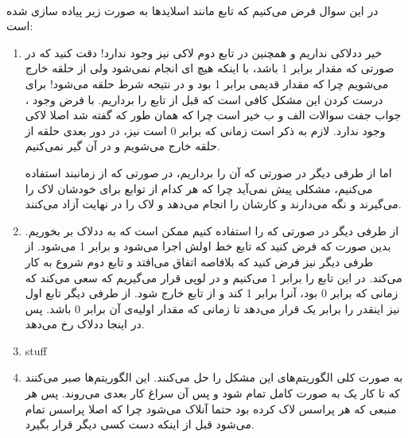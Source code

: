 \\\noindent
در این سوال فرض می‌کنیم که تابع
مانند اسلاید‌ها به صورت زیر پیاده سازی شده است:
\begin{enumerate}
    \item خیر ددلاکی نداریم و همچنین در تابع دوم لاکی نیز وجود ندارد!
    دقت کنید که در صورتی که مقدار
    برابر 1 باشد، با اینکه هیچ
    ای
    انجام نمی‌شود ولی از حلقه خارج می‌شویم چرا که مقدار قدیمی
    برابر 1 بود و در نتیجه شرط حلقه
    می‌شود! برای درست کردن این مشکل کافی است که
    \codeword{!}
    قبل از تابع را برداریم.
    با فرض وجود
    ،
    جواب جفت سوالات الف و ب خیر است چرا که همان طور که گفته شد اصلا لاکی وجود ندارد.
    لازم به ذکر است زمانی که
    برابر 0 است نیز، در دور بعدی حلقه از حلقه خارج می‌شویم و در آن گیر نمی‌کنیم.

    \noindent
    اما از طرفی دیگر در صورتی که آن
    \codeword{!}
    را برداریم، در صورتی که از زمانبند
    استفاده می‌کنیم، مشکلی پیش نمی‌آید چرا که هر کدام از توابع برای خودشان لاک را می‌گیرند و نگه می‌دارند
    و کارشان را انجام می‌دهد و لاک را در نهایت آزاد می‌کنند.
    \item از طرفی دیگر در صورتی که
    را استفاده کنیم ممکن است که به ددلاک بر بخوریم. بدین صورت که فرض کنید که تابع
    خط اولش اجرا می‌شود و
    برابر 1 می‌شود. از طرفی دیگر نیز فرض کنید که بلافاصه
    اتفاق می‌افتد و تابع دوم شروع به کار می‌کند. در این تابع
    را برابر 1 می‌کنیم و در لوپی قرار می‌گیریم که سعی می‌کند که زمانی که
    برابر 0 بود، آنرا برابر 1 کند و از تابع خارج شود.
    از طرفی دیگر تابع اول نیز اینقدر
    را برابر یک قرار می‌دهد تا زمانی که مقدار اولیه‌ی آن برابر 0 باشد. پس در اینجا ددلاک رخ می‌دهد.
    \item stuff
    \item به صورت کلی الگوریتم‌های
    این مشکل را حل می‌کنند. این الگوریتم‌ها صبر می‌کنند که تا کار یک
    به صورت کامل تمام شود و پس آن سراغ کار بعدی می‌روند. پس هر منبعی که هر پراسس لاک کرده بود
    حتما آنلاک می‌شود چرا که اصلا پراسس تمام می‌شود قبل از اینکه
    دست کسی دیگر قرار بگیرد.
\end{enumerate}



